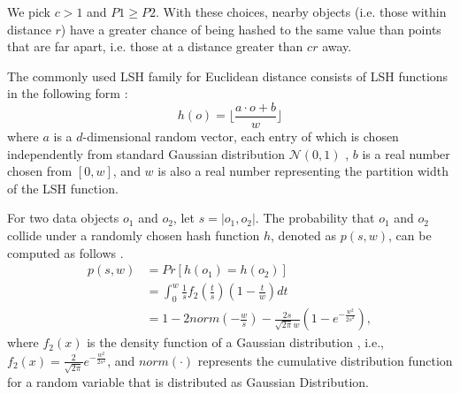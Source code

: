 We pick $c>1$ and $P1\geq P2$. With these choices, nearby objects (i.e.
those within distance $r$) have a greater chance of being hashed to
the same value than points that are far apart, i.e. those at a
distance greater than $cr$ away.

The commonly used LSH family for Euclidean distance consists of LSH functions in the following form
\cite{datar}:
%
\begin{equation}\label{eq:lsh}
%
    h(o)=\bigg\lfloor \frac{a\cdot o+b}{w}\bigg\rfloor
%
\end{equation}
%
where $a$ is a $d$-dimensional random vector, each entry of which is
chosen independently from standard Gaussian distribution $\mathcal{N}(0,1)$ \cite{stabledist},
$b$ is a real number chosen from $[0,w]$, and $w$ is also a real
number representing the partition width of the LSH function.

For two data objects $o_1$ and $o_2$, let $s=|o_1,o_2|$. The probability that $o_1$ and $o_2$ collide under a randomly chosen hash function $h$, denoted as $p(s,w)$, can be computed as follows \cite{datar}.
\begin{equation}\label{eq:prob}
\begin{aligned}
p(s,w)&=Pr[h(o_1)=h(o_2)]\\
      &=\int_{0}^{w}\frac{1}{s}f_2(\frac{t}{s})(1-\frac{t}{w})dt\\
      &=1-2norm(-\frac{w}{s})-\frac{2s}{\sqrt{2\pi}w}(1-e^{-\frac{w^2}{2s^2}}),
\end{aligned}
\end{equation}
where $f_2(x)$ is the density function of a Gaussian distribution \cite{datar}, i.e., $f_2(x)=\frac{2}{\sqrt{2\pi}}e^{-\frac{w^2}{2s^2}}$, and $norm(\cdot)$ represents the cumulative distribution function for a random variable that is distributed as Gaussian Distribution.


